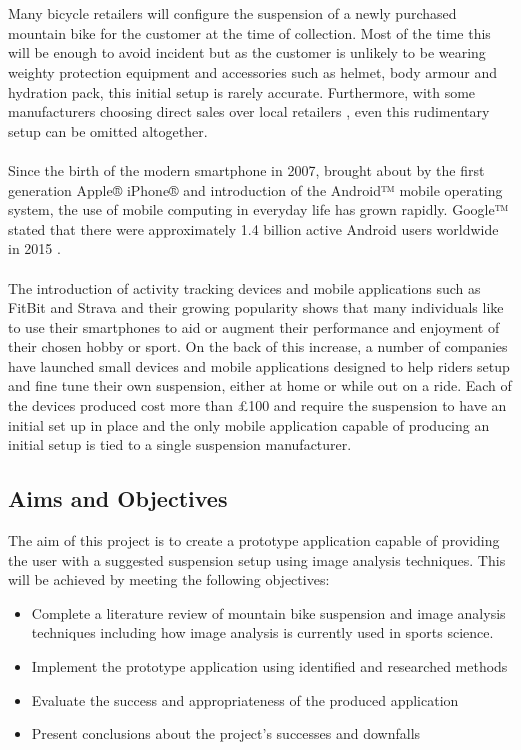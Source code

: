 	\\\\
	Many bicycle retailers will configure the suspension of a newly purchased mountain bike for the customer at the time of collection. Most of the time this will be enough to avoid incident but as the customer is unlikely to be wearing weighty protection equipment and accessories such as helmet, body armour and hydration pack, this initial setup is rarely accurate. Furthermore, with some manufacturers choosing direct sales over
	local retailers \citep{roseonline,ytonline}, even this rudimentary setup can be omitted altogether.
	\\\\
	Since the birth of the modern smartphone in 2007, brought about by the first generation Apple® iPhone® and introduction of the Android™ mobile operating system, the use of mobile computing in everyday life has grown rapidly. Google™ stated that there were approximately 1.4 billion active Android users worldwide in 2015 \citep{androidusers}.
	\\\\
	The introduction of activity tracking devices and mobile applications such as FitBit \citep{fitbit} and Strava \citep{strava} and their growing popularity \citep{apppopularity} shows that many individuals like to use their smartphones to aid or augment their performance and enjoyment of their chosen hobby or sport. On the back of this increase, a number of companies have launched small devices \citep{sussmybike, shockwiztrademark} and mobile applications \citep{foxird} designed to help riders setup and fine tune their own suspension, either at home or while out on a ride. Each of the devices produced cost more than £100 and require the suspension to have an initial set up in place and the only mobile application capable of producing an initial setup is tied to a single suspension manufacturer.
\subsection{Aims and Objectives}\label{sec:aims_and_objectives}
	The aim of this project is to create a prototype application capable of providing the user with a suggested suspension setup using image analysis techniques. This will be achieved by meeting the following objectives:
	\begin{itemize}
		\item Complete a literature review of mountain bike suspension and image analysis techniques including how image analysis is currently used in sports science.
		\item Implement the prototype application using identified and researched methods
		\item Evaluate the success and appropriateness of the produced application
		\item Present conclusions about the project's successes and downfalls
	\end{itemize}
